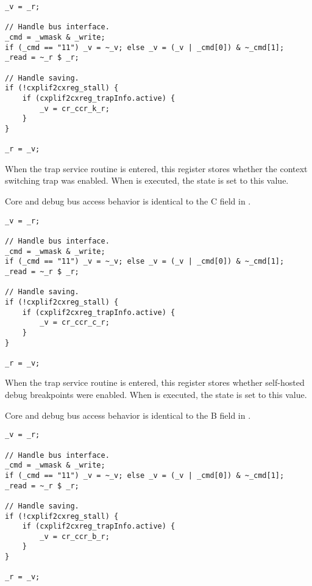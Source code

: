\declaration{}
\implementation{}
\begin{lstlisting}
_v = _r;

// Handle bus interface.
_cmd = _wmask & _write;
if (_cmd == "11") _v = ~_v; else _v = (_v | _cmd[0]) & ~_cmd[1];
_read = ~_r $ _r;

// Handle saving.
if (!cxplif2cxreg_stall) {
    if (cxplif2cxreg_trapInfo.active) {
        _v = cr_ccr_k_r;
    }
}

_r = _v;
\end{lstlisting}

When the trap service routine is entered, this register stores whether the 
context switching trap was enabled. When  is executed, the state is 
set to this value.

Core and debug bus access behavior is identical to the C field in .

\declaration{}
\implementation{}
\begin{lstlisting}
_v = _r;

// Handle bus interface.
_cmd = _wmask & _write;
if (_cmd == "11") _v = ~_v; else _v = (_v | _cmd[0]) & ~_cmd[1];
_read = ~_r $ _r;

// Handle saving.
if (!cxplif2cxreg_stall) {
    if (cxplif2cxreg_trapInfo.active) {
        _v = cr_ccr_c_r;
    }
}

_r = _v;
\end{lstlisting}

When the trap service routine is entered, this register stores whether 
self-hosted debug breakpoints were enabled. When  is executed, the 
state is set to this value.

Core and debug bus access behavior is identical to the B field in .

\declaration{}
\implementation{}
\begin{lstlisting}
_v = _r;

// Handle bus interface.
_cmd = _wmask & _write;
if (_cmd == "11") _v = ~_v; else _v = (_v | _cmd[0]) & ~_cmd[1];
_read = ~_r $ _r;

// Handle saving.
if (!cxplif2cxreg_stall) {
    if (cxplif2cxreg_trapInfo.active) {
        _v = cr_ccr_b_r;
    }
}

_r = _v;
\end{lstlisting}

